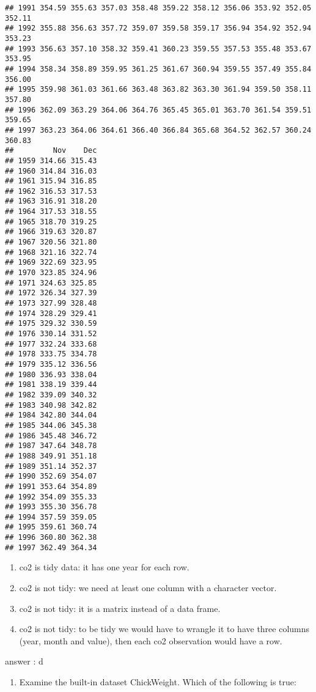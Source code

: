 \documentclass[
]{article}
\providecommand{\tightlist}{%
  \setlength{\itemsep}{0pt}\setlength{\parskip}{0pt}}
\begin{document}
\begin{verbatim}
## 1991 354.59 355.63 357.03 358.48 359.22 358.12 356.06 353.92 352.05 352.11
## 1992 355.88 356.63 357.72 359.07 359.58 359.17 356.94 354.92 352.94 353.23
## 1993 356.63 357.10 358.32 359.41 360.23 359.55 357.53 355.48 353.67 353.95
## 1994 358.34 358.89 359.95 361.25 361.67 360.94 359.55 357.49 355.84 356.00
## 1995 359.98 361.03 361.66 363.48 363.82 363.30 361.94 359.50 358.11 357.80
## 1996 362.09 363.29 364.06 364.76 365.45 365.01 363.70 361.54 359.51 359.65
## 1997 363.23 364.06 364.61 366.40 366.84 365.68 364.52 362.57 360.24 360.83
##         Nov    Dec
## 1959 314.66 315.43
## 1960 314.84 316.03
## 1961 315.94 316.85
## 1962 316.53 317.53
## 1963 316.91 318.20
## 1964 317.53 318.55
## 1965 318.70 319.25
## 1966 319.63 320.87
## 1967 320.56 321.80
## 1968 321.16 322.74
## 1969 322.69 323.95
## 1970 323.85 324.96
## 1971 324.63 325.85
## 1972 326.34 327.39
## 1973 327.99 328.48
## 1974 328.29 329.41
## 1975 329.32 330.59
## 1976 330.14 331.52
## 1977 332.24 333.68
## 1978 333.75 334.78
## 1979 335.12 336.56
## 1980 336.93 338.04
## 1981 338.19 339.44
## 1982 339.09 340.32
## 1983 340.98 342.82
## 1984 342.80 344.04
## 1985 344.06 345.38
## 1986 345.48 346.72
## 1987 347.64 348.78
## 1988 349.91 351.18
## 1989 351.14 352.37
## 1990 352.69 354.07
## 1991 353.64 354.89
## 1992 354.09 355.33
## 1993 355.30 356.78
## 1994 357.59 359.05
## 1995 359.61 360.74
## 1996 360.80 362.38
## 1997 362.49 364.34
\end{verbatim}

\begin{enumerate}
\def\labelenumi{\alph{enumi}.}
\tightlist
\item
  co2 is tidy data: it has one year for each row.
\item
  co2 is not tidy: we need at least one column with a character vector.
\item
  co2 is not tidy: it is a matrix instead of a data frame.
\item
  co2 is not tidy: to be tidy we would have to wrangle it to have three
  columns (year, month and value), then each co2 observation would have
  a row.
\end{enumerate}

answer : d

\begin{enumerate}
\def\labelenumi{\arabic{enumi}.}
\setcounter{enumi}{1}
\tightlist
\item
  Examine the built-in dataset ChickWeight. Which of the following is
  true:
\end{enumerate}
\end{document}

